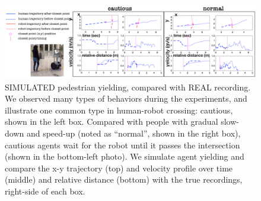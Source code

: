 \documentclass[letterpaper, 10 pt, conference]{ieeeconf}  %
\begin{document}
   \begin{figure}[t]
      \vspace{-1em}
      \centering
      \hspace{-5em}
      \vspace{-1em}
      \includegraphics[scale=0.48]{iros_exp}
      \hspace{-5em}
      \caption{SIMULATED pedestrian yielding, compared with REAL recording. 
      We observed many types of behaviors during the experiments, and 
      illustrate one common type in human-robot crossing: cautious, shown in 
      the left box. Compared with people with 
      gradual slow-down and speed-up (noted as ``normal'', shown in the right 
      box), cautious agents 
      wait for the robot until it passes the intersection (shown in the 
      bottom-left photo). We simulate agent yielding and compare the x-y 
      trajectory (top) and velocity profile over time (middle) and relative 
      distance (bottom) with the true recordings, right-side of each box.   
      }
      \vspace{-1.5em}
     \label{fig:cautious_recording}
   \end{figure}
\end{document}

